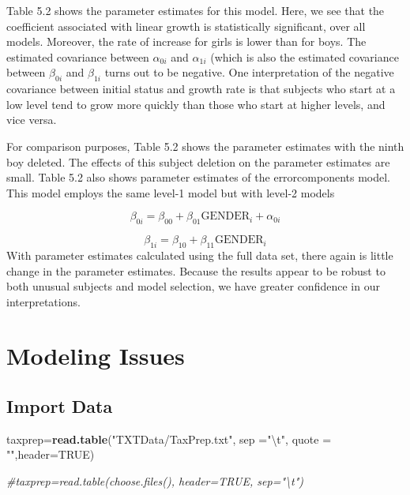 \documentclass[]{book}
\newenvironment{Shaded}{\begin{snugshade}}{\end{snugshade}}
\newcommand{\CharTok}[1]{\textcolor[rgb]{0.31,0.60,0.02}{#1}}
\newcommand{\CommentTok}[1]{\textcolor[rgb]{0.56,0.35,0.01}{\textit{#1}}}
\newcommand{\DataTypeTok}[1]{\textcolor[rgb]{0.13,0.29,0.53}{#1}}
\newcommand{\KeywordTok}[1]{\textcolor[rgb]{0.13,0.29,0.53}{\textbf{#1}}}
\newcommand{\NormalTok}[1]{#1}
\newcommand{\OtherTok}[1]{\textcolor[rgb]{0.56,0.35,0.01}{#1}}
\newcommand{\StringTok}[1]{\textcolor[rgb]{0.31,0.60,0.02}{#1}}
\begin{document}
Table 5.2 shows the parameter estimates for this model. Here, we see that the coefficient associated with linear growth is statistically significant, over all models. Moreover, the rate of increase for girls is lower than for boys. The estimated covariance between \(\alpha_{0i}\) and \(\alpha_{1i}\) (which is also the estimated covariance between \(\beta_{0i}\) and \(β_{1i}\) turns out to be negative. One interpretation of the negative covariance between initial status and growth rate is that subjects who start at a low level tend to grow more quickly than those who start at higher levels, and vice versa.

For comparison purposes, Table 5.2 shows the parameter estimates with the ninth boy deleted. The effects of this subject deletion on the parameter estimates are small. Table 5.2 also shows parameter estimates of the errorcomponents model. This model employs the same level-1 model but with level-2 models

\[\beta_{0i}=\beta_{00}+\beta_{01} \text{GENDER}_i + \alpha_{0i}\]

\[\beta_{1i}=\beta_{10}+\beta_{11} \text{GENDER}_i\]
With parameter estimates calculated using the full data set, there again is little change in the parameter estimates. Because the results appear to be robust to both unusual subjects and model selection, we have greater confidence in our interpretations.

\hypertarget{modeling-issues}{%
\chapter{Modeling Issues}\label{modeling-issues}}

\hypertarget{import-data-5}{%
\section{Import Data}\label{import-data-5}}

\begin{Shaded}
\begin{Highlighting}[]
\NormalTok{taxprep=}\KeywordTok{read.table}\NormalTok{(}\StringTok{"TXTData/TaxPrep.txt"}\NormalTok{, }\DataTypeTok{sep =}\StringTok{"}\CharTok{\textbackslash{}t}\StringTok{"}\NormalTok{, }\DataTypeTok{quote =} \StringTok{""}\NormalTok{,}\DataTypeTok{header=}\OtherTok{TRUE}\NormalTok{)}

\CommentTok{#taxprep=read.table(choose.files(), header=TRUE, sep="\textbackslash{}t")}
\end{Highlighting}
\end{Shaded}
\end{document}
